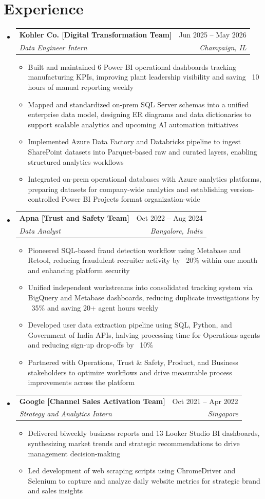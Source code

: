 \documentclass[letterpaper,11pt]{article}
\makeatletter
\newcommand{\resumeItem}[2]{
  \item{
    \textbf{#1}{: #2 \vspace{-2pt}}
  }
}
\newcommand{\resumeSubheading}[4]{
  \vspace{0pt}\item
    \begin{tabular*}{\textwidth}{l@{\extracolsep{\fill}}r}
      \textbf{#1} & #2 \\
      \textit{#3} & \textit{#4} \\ 
    \end{tabular*}\vspace{-6pt}
}
\newcommand{\resumeSubHeadingListStart}{\begin{itemize}[leftmargin=0pt,label={},itemsep=-2pt]}
\newcommand{\resumeSubHeadingListEnd}{\end{itemize}}
\newcommand{\resumeItemListStart}{\begin{itemize}[leftmargin=12pt, nosep, topsep=2pt]}
\newcommand{\resumeItemListEnd}{\end{itemize}}
\renewcommand{\resumeItem}[2]{
  \item {#2}
}
\makeatother
\begin{document}
\section{Experience}
  \resumeSubHeadingListStart
{}
\resumeSubheading
      {Kohler Co. [Digital Transformation Team]}{Jun 2025 -- May 2026}
      {Data Engineer Intern}{Champaign, IL}
      \resumeItemListStart
        \resumeItem{Platform Development}
          {Built and maintained 6 Power BI operational dashboards tracking manufacturing KPIs, improving plant leadership visibility and saving ~10 hours of manual reporting weekly}
        \resumeItem{Enterprise Data Architecture}
          {Mapped and standardized on-prem SQL Server schemas into a unified enterprise data model, designing ER diagrams and data dictionaries to support scalable analytics and upcoming AI automation initiatives}
        \resumeItem{ETL Pipeline Implementation}
          {Implemented Azure Data Factory and Databricks pipeline to ingest SharePoint datasets into Parquet-based raw and curated layers, enabling structured analytics workflows}
        \resumeItem{System Integration}
          {Integrated on-prem operational databases with Azure analytics platforms, preparing datasets for company-wide analytics and establishing version-controlled Power BI Projects format organization-wide}
      \resumeItemListEnd
{}
\resumeSubheading
      {Apna [Trust and Safety Team]}{Oct 2022 -- Aug 2024}
      {Data Analyst}{Bangalore, India}
      \resumeItemListStart
        \resumeItem{Fraud Detection System}
          {Pioneered SQL-based fraud detection workflow using Metabase and Retool, reducing fraudulent recruiter activity by ~20\% within one month and enhancing platform security}
        \resumeItem{Operational Efficiency}
          {Unified independent workstreams into consolidated tracking system via BigQuery and Metabase dashboards, reducing duplicate investigations by ~35\% and saving 20+ agent hours weekly}
        \resumeItem{API Integration \& Automation}
          {Developed user data extraction pipeline using SQL, Python, and Government of India APIs, halving processing time for Operations agents and reducing sign-up drop-offs by ~10\%}
        \resumeItem{Cross-functional Impact}
          {Partnered with Operations, Trust \& Safety, Product, and Business stakeholders to optimize workflows and drive measurable process improvements across the platform}
      \resumeItemListEnd
{}
\resumeSubheading
      {Google [Channel Sales Activation Team]}{Oct 2021 -- Apr 2022}
      {Strategy and Analytics Intern}{Singapore}
      \resumeItemListStart
        \resumeItem{Business Intelligence}
          {Delivered biweekly business reports and 13 Looker Studio BI dashboards, synthesizing market trends and strategic recommendations to drive management decision-making}
        \resumeItem{Data Engineering}
          {Led development of web scraping scripts using ChromeDriver and Selenium to capture and analyze daily website metrics for strategic brand and sales insights}
      \resumeItemListEnd
  \resumeSubHeadingListEnd
\end{document}

